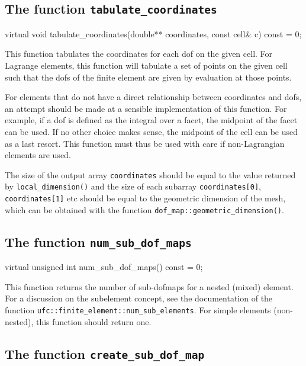 \subsection{The function \texttt{tabulate\_coordinates}}

\begin{code}
virtual void tabulate_coordinates(double** coordinates,
                                  const cell& c) const = 0;
\end{code}

This function tabulates the coordinates for each dof on the given
cell. For Lagrange elements, this function will tabulate a set of
points on the given cell such that the dofs of the finite element are
given by evaluation at those points.

For elements that do not have a direct relationship between
coordinates and dofs, an attempt should be made at a sensible
implementation of this function. For example, if a dof is defined as
the integral over a facet, the midpoint of the facet can be used. If
no other choice makes sense, the midpoint of the cell can be used as a
last resort. This function must thus be used with care if
non-Lagrangian elements are used.

The size of the output array \texttt{coordinates} should be equal to
the value returned by \texttt{local\_dimension()} and the size of each
subarray \texttt{coordi\-nates[0]}, \texttt{coordinates[1]} etc should
be equal to the geometric dimension of the mesh, which can be obtained
with the function \texttt{dof\_map::geometric\_dimension()}.

\subsection{The function \texttt{num\_sub\_dof\_maps}}

\begin{code}
virtual unsigned int num_sub_dof_maps() const = 0;
\end{code}

This function returns the number of sub-dofmaps for a nested (mixed)
element. For a discussion on the subelement concept, see the
documentation of the function
\texttt{ufc::finite\_element::num\_sub\_elements}. For simple
elements (non-nested), this function should return one.

\subsection{The function \texttt{create\_sub\_dof\_map}}

